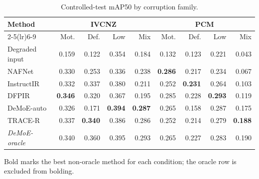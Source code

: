 \begin{table}[!t]
\centering
\caption{Controlled-test mAP50 by corruption family.}
\label{tab:condition_results}
\scriptsize
\begin{tabular}{lrrrrrrrr}
\toprule
Method & \multicolumn{4}{c}{IVCNZ} & \multicolumn{4}{c}{PCM} \\
\cmidrule(lr){2-5}\cmidrule(lr){6-9}
 & Mot. & Def. & Low & Mix & Mot. & Def. & Low & Mix \\
\midrule
Degraded input & 0.159 & 0.122 & 0.354 & 0.184 & 0.132 & 0.123 & 0.221 & 0.043 \\
NAFNet & 0.330 & 0.253 & 0.336 & 0.238 & \textbf{0.286} & 0.217 & 0.234 & 0.067 \\
InstructIR & 0.332 & 0.337 & 0.380 & 0.211 & 0.252 & \textbf{0.231} & 0.264 & 0.103 \\
DFPIR & \textbf{0.346} & 0.320 & 0.367 & 0.195 & 0.285 & 0.228 & \textbf{0.293} & 0.119 \\
DeMoE-auto & 0.326 & 0.171 & \textbf{0.394} & \textbf{0.287} & 0.265 & 0.158 & 0.287 & 0.175 \\
TRACE-R & 0.337 & \textbf{0.340} & 0.386 & 0.286 & 0.252 & 0.214 & 0.279 & \textbf{0.188} \\
\emph{DeMoE-oracle} & 0.340 & 0.360 & 0.395 & 0.293 & 0.265 & 0.227 & 0.283 & 0.190 \\
\bottomrule
\end{tabular}
\vspace{1mm}
\parbox{0.97\textwidth}{\scriptsize Bold marks the best non-oracle method for each condition; the oracle row is excluded from bolding.}
\end{table}
